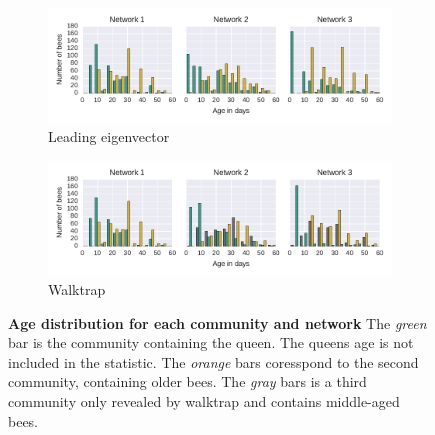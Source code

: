 \begin{figure}[htb]
	\centering
	\begin{subfigure}[b]{1.0\textwidth}
		\centering
		\includegraphics[width=1.0\textwidth]{Figures/ageDistribution-LE}
		\caption[Leading eigenvector]{Leading eigenvector}
		\label{fig:ageLE}
		\vspace*{5mm}
	\end{subfigure}
	\begin{subfigure}[b]{1.0\textwidth}	
		\centering
		\includegraphics[width=1.0\textwidth]{Figures/ageDistribution-WT}
		\caption[Walktrap]{Walktrap}
		\label{fig:ageWT}
		\vspace*{5mm}
	\end{subfigure}
	\caption[Age distribution for each community and network] {\textbf{Age distribution for each community and network} The \emph{green} bar is the community containing the queen. The queens age is not included in the statistic. The \emph{orange} bars coresspond to the second community, containing older bees. The \emph{gray} bars is a third community only revealed by walktrap and contains middle-aged bees.}
	\label{fig:ageDistribution}
\end{figure}

